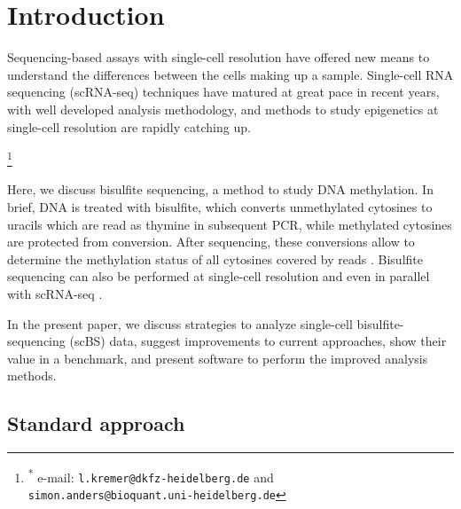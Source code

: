 \documentclass[twocolumn,10pt]{article}
\newcommand\blfootnote[1]{%
    \begingroup
    \renewcommand\thefootnote{}\footnote{#1}%
    \addtocounter{footnote}{-1}%
    \endgroup
}
\begin{document}
\section{Introduction}

Sequencing-based assays with single-cell resolution have offered new means to understand the differences between the cells making up a sample.
Single-cell RNA sequencing (scRNA-seq) techniques have matured at great pace in recent years, with well developed analysis methodology, and methods to study epigenetics at single-cell resolution are rapidly catching up.

\blfootnote{\hspace{-.5cm}\raggedright\textsuperscript{*} e-mail:  \texttt{l.kremer@dkfz-heidelberg.de} and\\ \hspace{1cm}\texttt{simon.anders@bioquant.uni-heidelberg.de}}

Here, we discuss bisulfite sequencing, a method to study DNA methylation.
In brief, DNA is treated with bisulfite, which converts unmethylated cytosines to uracils which are read as thymine in subsequent PCR, while methylated cytosines are protected from conversion.
After sequencing, these conversions allow to determine the methylation status of all cytosines covered by reads \citep{Frommer_1992}.
Bisulfite sequencing can also be performed at single-cell resolution \citep{Smallwood_2014} and even in parallel with scRNA-seq \citep{scMTseq,Clark2018}.

In the present paper, we discuss strategies to analyze single-cell bisulfite-sequencing (scBS) data, suggest improvements to current approaches, show their value in a benchmark, and present software to perform the improved analysis methods.

\subsection{Standard approach}
\end{document}
